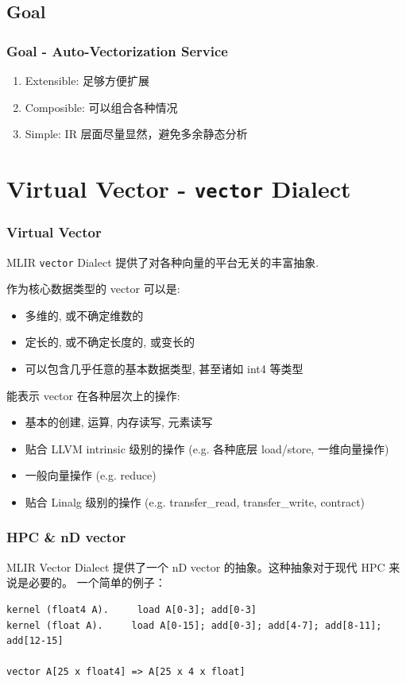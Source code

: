 \documentclass[aspectratio=169]{ctexbeamer}
\begin{document}
\subsection{Goal}

\begin{frame}
    \frametitle{Goal - Auto-Vectorization Service}

    \begin{enumerate}
        \item Extensible: 足够方便扩展
        \item Composible: 可以组合各种情况
        \item Simple: IR 层面尽量显然，避免多余静态分析
    \end{enumerate}
\end{frame}

\section{Virtual Vector - \texttt{vector} Dialect}

\begin{frame}
    \frametitle{Virtual Vector}

    MLIR \texttt{vector} Dialect 提供了对各种向量的平台无关的丰富抽象.

    作为核心数据类型的 vector 可以是:
    \begin{itemize}
        \item 多维的, 或不确定维数的
        \item 定长的, 或不确定长度的, 或变长的
        \item 可以包含几乎任意的基本数据类型, 甚至诸如 int4 等类型
    \end{itemize}

    能表示 vector 在各种层次上的操作:
    \begin{itemize}
        \item 基本的创建, 运算, 内存读写, 元素读写
        \item 贴合 LLVM intrinsic 级别的操作 (e.g. 各种底层 load/store, 一维向量操作)
        \item 一般向量操作 (e.g. reduce)
        \item 贴合 Linalg 级别的操作 (e.g. transfer\_read, transfer\_write, contract)
    \end{itemize}
\end{frame}

\begin{frame}[fragile]
    \frametitle{HPC \& nD vector}
    MLIR Vector Dialect 提供了一个 nD vector 的抽象。这种抽象对于现代 HPC 来说是必要的。
    一个简单的例子：

    \begin{lstlisting}
kernel (float4 A).     load A[0-3]; add[0-3]
kernel (float A).     load A[0-15]; add[0-3]; add[4-7]; add[8-11]; add[12-15]

vector A[25 x float4] => A[25 x 4 x float]
    \end{lstlisting}
\end{frame}
\end{document}
